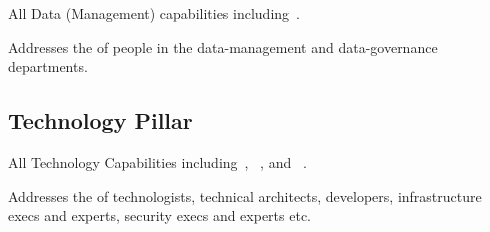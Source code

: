 All Data (Management) capabilities including~.

Addresses the  of people in the data-management and data-governance departments.

\subsection{Technology Pillar}\label{subsec:ekg-mm-the-four-pillars-technology-pillar}

All Technology Capabilities including~,
~, and
~.

Addresses the  of technologists, technical architects, developers, infrastructure execs and experts,
security execs and experts etc.


